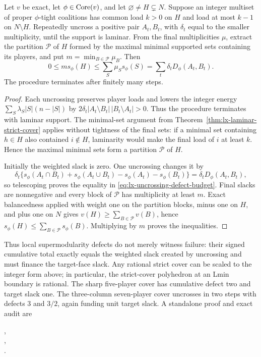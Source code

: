 \begin{theorem}
\label{thm:lx-uncrossing-defect-budget}
Let $v$ be exact, let $\phi\in\operatorname{Core}(v)$, and let
$\varnothing\ne H\subsetneq N$.  Suppose an integer multiset of proper
$\phi$-tight coalitions has common load $k>0$ on $H$ and load at most $k-1$
on $N\setminus H$.  Repeatedly uncross a positive pair $A_t,B_t$, with
$\delta_t$ equal to the smaller multiplicity, until the support is laminar.
From the final multiplicities $\mu$, extract the partition $\mathcal P$ of
$H$ formed by the maximal minimal supported sets containing its players, and
put $m=\min_{B\in\mathcal P}\mu_B$.  Then
\[
 0\leq m s_\phi(H)
 \leq \sum_S\mu_Ss_\phi(S)
 =\sum_t\delta_tD_\phi(A_t,B_t).                     \tag{UDB}
 \label{eq:lx-uncrossing-defect-budget}
\]
The procedure terminates after finitely many steps.
\end{theorem}

\begin{proof}
Each uncrossing preserves player loads and lowers the integer energy
$\sum_S\lambda_S|S|(n-|S|)$ by
$2\delta_t|A_t\setminus B_t|\,|B_t\setminus A_t|>0$.
Thus the procedure terminates with laminar support.  The minimal-set argument
from Theorem~\ref{thm:lx-laminar-strict-cover} applies without tightness of
the final sets: if a minimal set containing $h\in H$ also contained
$i\notin H$, laminarity would make the final load of $i$ at least $k$.
Hence the maximal minimal sets form a partition $\mathcal P$ of $H$.

Initially the weighted slack is zero.  One uncrossing changes it by
\[
 \delta_t\{s_\phi(A_t\cap B_t)+s_\phi(A_t\cup B_t)
            -s_\phi(A_t)-s_\phi(B_t)\}
 =\delta_tD_\phi(A_t,B_t),
\]
so telescoping proves the equality in
\eqref{eq:lx-uncrossing-defect-budget}.  Final slacks are nonnegative and
every block of $\mathcal P$ has multiplicity at least $m$.  Exact balancedness
applied with weight one on the partition blocks, minus one on $H$, and plus
one on $N$ gives
$v(H)\geq\sum_{B\in\mathcal P}v(B)$, hence
$s_\phi(H)\leq\sum_{B\in\mathcal P}s_\phi(B)$.  Multiplying by $m$ proves
the inequalities.
\end{proof}

Thus local supermodularity defects do not merely witness failure: their signed
cumulative total exactly equals the weighted slack created by uncrossing and
must finance the target-face slack.  Any rational strict cover can be scaled
to the integer form above; in particular, the strict-cover polyhedron at an
Lmin boundary is rational.  The sharp five-player cover has cumulative defect
two and target slack one.  The three-column seven-player cover uncrosses in
two steps with defects $3$ and $3/2$, again funding unit target slack.  A
standalone proof and exact audit are
\begin{center}
\small{},\\[-2pt]
\small{},\\[-2pt]
\small{}.
\end{center}

